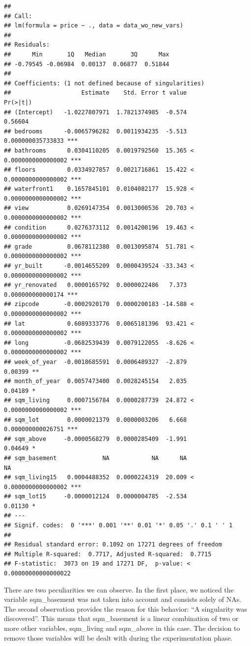 \documentclass[table]{article}
\begin{document}
\begin{verbatim}
## 
## Call:
## lm(formula = price ~ ., data = data_wo_new_vars)
## 
## Residuals:
##      Min       1Q   Median       3Q      Max 
## -0.79545 -0.06984  0.00137  0.06877  0.51844 
## 
## Coefficients: (1 not defined because of singularities)
##                    Estimate    Std. Error t value             Pr(>|t|)    
## (Intercept)   -1.0227807971  1.7821374985  -0.574              0.56604    
## bedrooms      -0.0065796282  0.0011934235  -5.513    0.000000035733833 ***
## bathrooms      0.0304110205  0.0019792560  15.365 < 0.0000000000000002 ***
## floors         0.0334927857  0.0021716861  15.422 < 0.0000000000000002 ***
## waterfront1    0.1657845101  0.0104082177  15.928 < 0.0000000000000002 ***
## view           0.0269147354  0.0013000536  20.703 < 0.0000000000000002 ***
## condition      0.0276373112  0.0014200196  19.463 < 0.0000000000000002 ***
## grade          0.0678112380  0.0013095874  51.781 < 0.0000000000000002 ***
## yr_built      -0.0014655209  0.0000439524 -33.343 < 0.0000000000000002 ***
## yr_renovated   0.0000165792  0.0000022486   7.373    0.000000000000174 ***
## zipcode       -0.0002920170  0.0000200183 -14.588 < 0.0000000000000002 ***
## lat            0.6089333776  0.0065181396  93.421 < 0.0000000000000002 ***
## long          -0.0682539439  0.0079122055  -8.626 < 0.0000000000000002 ***
## week_of_year  -0.0018685591  0.0006489327  -2.879              0.00399 ** 
## month_of_year  0.0057473400  0.0028245154   2.035              0.04189 *  
## sqm_living     0.0007156784  0.0000287739  24.872 < 0.0000000000000002 ***
## sqm_lot        0.0000021379  0.0000003206   6.668    0.000000000026751 ***
## sqm_above     -0.0000568279  0.0000285409  -1.991              0.04649 *  
## sqm_basement             NA            NA      NA                   NA    
## sqm_living15   0.0004488352  0.0000224319  20.009 < 0.0000000000000002 ***
## sqm_lot15     -0.0000012124  0.0000004785  -2.534              0.01130 *  
## ---
## Signif. codes:  0 '***' 0.001 '**' 0.01 '*' 0.05 '.' 0.1 ' ' 1
## 
## Residual standard error: 0.1092 on 17271 degrees of freedom
## Multiple R-squared:  0.7717, Adjusted R-squared:  0.7715 
## F-statistic:  3073 on 19 and 17271 DF,  p-value: < 0.00000000000000022
\end{verbatim}

\hfill\break
There are two peculiarities we can observe. In the first place, we
noticed the variable sqm\_basement was not taken into account and
consists solely of NAs. The second observation provides the reason for
this behavior: ``A singularity was discovered''. This means that
sqm\_basement is a linear combination of two or more other variables,
sqm\_living and sqm\_above in this case. The decision to remove those
variables will be dealt with during the experimentation phase.
\end{document}
